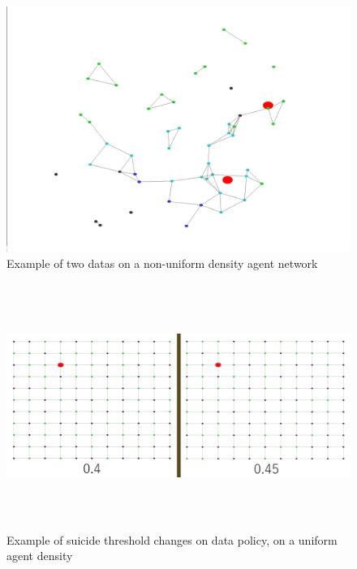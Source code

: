 \documentclass{UoYCSproject}
\begin{document}
\begin{figure}[htb]
\label{fig:Data7}
\begin{center}
\centering
\includegraphics[width=\linewidth, height=8cm]{"./Replication_No_Suicide_threshold_0.8_c2_Non_uniform.png"}
\caption{Example of two datas on a non-uniform density agent network}
\end{center}
\end{figure}

\begin{figure}[htb]
\label{fig:Data8}
\begin{center}
\centering
\includegraphics[width=\linewidth, height=8cm]{"./Rep_Sui_0.8_0.4-0.45_uniform_no_mo.png"}
\caption{Example of suicide threshold changes on data policy, on a uniform agent density}
\end{center}
\end{figure}
\end{document}
